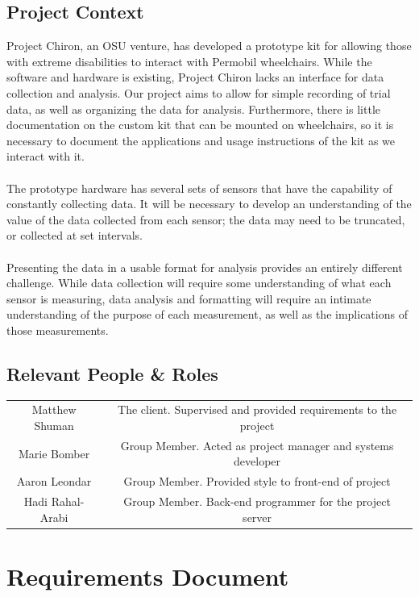 \documentclass[onecolumn, draftclsnofoot,10pt, compsoc]{report}
\begin{document}
\section{Project Context}
Project Chiron, an OSU venture, has developed a prototype kit for allowing those with extreme disabilities to interact with Permobil wheelchairs. While the software and hardware is existing, Project Chiron lacks an interface for data collection and analysis. Our project aims to allow for simple recording of trial data, as well as organizing the data for analysis. Furthermore, there is little documentation on the custom kit that can be mounted on wheelchairs, so it is necessary to document the applications and usage instructions of the kit as we interact with it.
\\\\
The prototype hardware has several sets of sensors that have the capability of constantly collecting data. It will be necessary to develop an understanding of the value of the data collected from each sensor; the data may need to be truncated, or collected at set intervals.
\\\\
Presenting the data in a usable format for analysis provides an entirely different challenge. While data collection will require some understanding of what each sensor is measuring, data analysis and formatting will require an intimate understanding of the purpose of each measurement, as well as the implications of those measurements.
\section{Relevant People \& Roles}
\begin{center}
	\begin{tabular}{ c|c }
		Matthew Shuman & The client. Supervised and provided requirements to the project\\
		Marie Bomber & Group Member. Acted as project manager and systems developer     \\
		Aaron Leondar & Group Member. Provided style to front-end of project\\
		Hadi Rahal-Arabi & Group Member. Back-end programmer for the project server  \\
				
	\end{tabular}
\end{center}

\chapter{Requirements Document}
\minitoc
\end{document}
